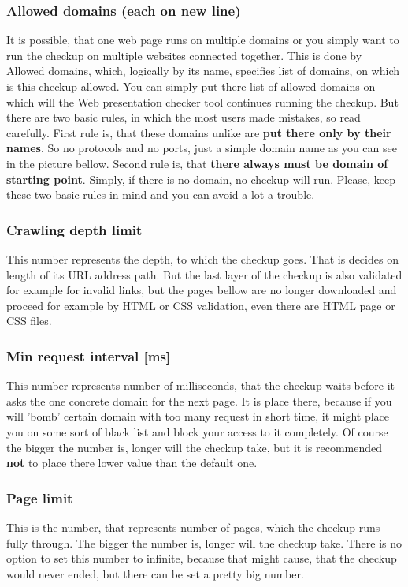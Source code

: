 \documentclass[12pt,a4paper]{article}
\begin{document}
\subsubsection{Allowed domains (each on new line)}
It is possible, that one web page runs on multiple domains or you simply want to run the checkup on multiple websites connected together. This is done by Allowed domains, which, logically by its name, specifies list of domains, on which is this checkup allowed. You can simply put there list of allowed domains on which will the Web presentation checker tool continues running the checkup. But there are two basic rules, in which the most users made mistakes, so read carefully. First rule is, that these domains unlike  are \textbf{put there only by their names}. So no protocols and no ports, just a simple domain name as you can see in the picture bellow. Second rule is, that \textbf{there always must be domain of  starting point}. Simply, if there is no domain, no checkup will run. Please, keep these two basic rules in mind and you can avoid a lot a trouble.

\subsubsection{Crawling depth limit}
This number represents the depth, to which the checkup goes. That is decides on length of its URL address path. But the last layer of the checkup is also validated for example for invalid links, but the pages bellow are no longer downloaded and proceed for example by HTML or CSS validation, even there are HTML page or CSS files.

\subsubsection{Min request interval [ms]}
This number represents number of milliseconds, that the checkup waits before it asks the one concrete domain for the next page. It is place there, because if you will 'bomb' certain domain with too many request in short time, it might place you on some sort of black list and block your access to it completely. Of course the bigger the number is, longer will the checkup take, but it is recommended \textbf{not} to place there lower value than the default one.

\subsubsection{Page limit}
This is the number, that represents number of pages, which the checkup runs fully through. The bigger the number is, longer will the checkup take. There is no option to set this number to infinite, because that might cause, that the checkup would never ended, but there can be set a pretty big number.
\end{document}
